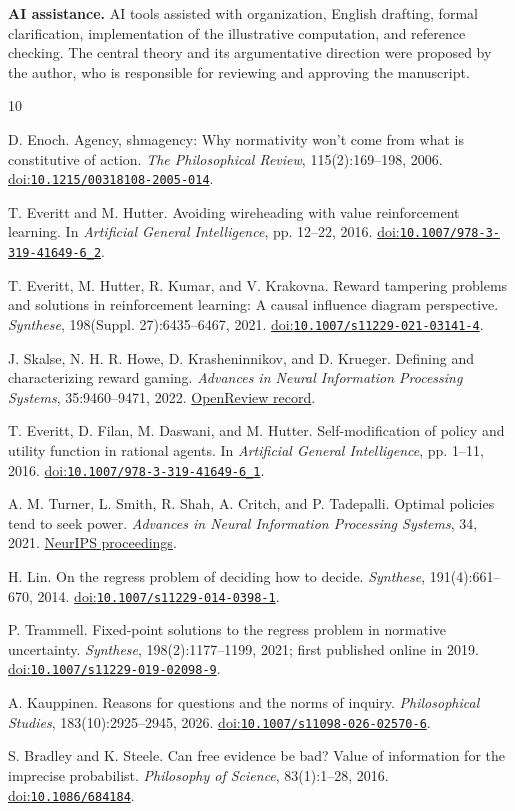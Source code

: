 \documentclass[11pt,a4paper]{article}
\newcommand{\doi}[1]{\href{https://doi.org/#1}{doi:\nolinkurl{#1}}}
\begin{document}
\noindent\textbf{AI assistance.} AI tools assisted with organization, English drafting, formal clarification, implementation of the illustrative computation, and reference checking. The central theory and its argumentative direction were proposed by the author, who is responsible for reviewing and approving the manuscript.

\begingroup
\small
\begin{thebibliography}{10}
\raggedright
\setlength{\itemsep}{0.35em}
D. Enoch.
Agency, shmagency: Why normativity won't come from what is constitutive of action.
\emph{The Philosophical Review}, 115(2):169--198, 2006.
\doi{10.1215/00318108-2005-014}.

T. Everitt and M. Hutter.
Avoiding wireheading with value reinforcement learning.
In \emph{Artificial General Intelligence}, pp. 12--22, 2016.
\doi{10.1007/978-3-319-41649-6_2}.

T. Everitt, M. Hutter, R. Kumar, and V. Krakovna.
Reward tampering problems and solutions in reinforcement learning: A causal influence diagram perspective.
\emph{Synthese}, 198(Suppl. 27):6435--6467, 2021.
\doi{10.1007/s11229-021-03141-4}.

J. Skalse, N. H. R. Howe, D. Krasheninnikov, and D. Krueger.
Defining and characterizing reward gaming.
\emph{Advances in Neural Information Processing Systems}, 35:9460--9471, 2022.
\href{https://openreview.net/forum?id=yb3HOXO3lX2}{OpenReview record}.

T. Everitt, D. Filan, M. Daswani, and M. Hutter.
Self-modification of policy and utility function in rational agents.
In \emph{Artificial General Intelligence}, pp. 1--11, 2016.
\doi{10.1007/978-3-319-41649-6_1}.

A. M. Turner, L. Smith, R. Shah, A. Critch, and P. Tadepalli.
Optimal policies tend to seek power.
\emph{Advances in Neural Information Processing Systems}, 34, 2021.
\href{https://proceedings.neurips.cc/paper/2021/hash/c26820b8a4c1b3c2aa868d6d57e14a79-Abstract.html}{NeurIPS proceedings}.

H. Lin.
On the regress problem of deciding how to decide.
\emph{Synthese}, 191(4):661--670, 2014.
\doi{10.1007/s11229-014-0398-1}.

P. Trammell.
Fixed-point solutions to the regress problem in normative uncertainty.
\emph{Synthese}, 198(2):1177--1199, 2021; first published online in 2019.
\doi{10.1007/s11229-019-02098-9}.

A. Kauppinen.
Reasons for questions and the norms of inquiry.
\emph{Philosophical Studies}, 183(10):2925--2945, 2026.
\doi{10.1007/s11098-026-02570-6}.

S. Bradley and K. Steele.
Can free evidence be bad? Value of information for the imprecise probabilist.
\emph{Philosophy of Science}, 83(1):1--28, 2016.
\doi{10.1086/684184}.
\end{thebibliography}
\endgroup
\end{document}
